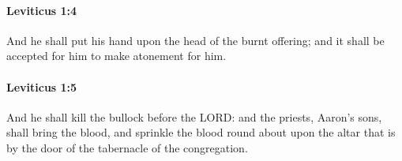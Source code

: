 		\paragraph{Leviticus 1:4} %
			\label{LEVITICUS-1-4}

			And he shall put his hand upon the head of the burnt offering; and it shall be accepted for him to make atonement for him.


		\paragraph{Leviticus 1:5} %
			\label{LEVITICUS-1-5}

			And he shall kill the bullock before the LORD: and the priests, Aaron’s sons, shall bring the blood, and sprinkle the blood round about upon the altar that is by the door of the tabernacle of the congregation.


